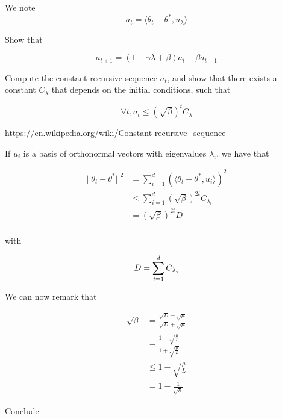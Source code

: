 \documentclass[
10pt, %
a4paper, %
oneside, %
headinclude,footinclude, %
BCOR5mm, %
]{scrartcl}
\begin{document}
We note
\begin{equation}
    a_t = \langle \theta_{t}- \theta^*, u_{\lambda} \rangle
\end{equation}

\exercice{} Show that 

\begin{equation}
    a_{t+1} = (1- \gamma \lambda +\beta) a_t- \beta a_{t-1}
\end{equation}

\exercice{\textbf{}} Compute the constant-recursive sequence $a_t$, and show
that there exists  a constant $C_{\lambda}$ that depends on the initial
conditions, such that

\begin{equation}
    \forall t, a_t\leq ( \sqrt{\beta} )^t C_{\lambda}
\end{equation}

\url{https://en.wikipedia.org/wiki/Constant-recursive_sequence} 

If $u_i$ is a basis of orthonormal vectors with eigenvalues $\lambda_i$, we have that

\begin{equation}
    \begin{aligned}
        \label{eq:}
	|| \theta_{t}-\theta^*||^2 &= \sum^{d}_{i=1}(\langle\theta_{t}-\theta^*, u_i \rangle)^2 \\
	&\leq \sum^{d}_{i=1} (\sqrt{\beta})^{2t} C_{\lambda_i}\\
	&= (\sqrt{\beta})^{2t} D\\
    \end{aligned}
\end{equation}

with 

\begin{equation}
    D = \sum^{d}_{i=1}  C_{\lambda_i}\\
\end{equation}

We can now remark that

\begin{equation}
    \begin{aligned}
        \label{eq:}
	\sqrt{\beta} &= \frac{ \sqrt{L} - \sqrt{\mu} }{ \sqrt{L} + \sqrt{\mu} } \\
	&=  \frac{1- \sqrt{ \frac{\mu}{L}}}{1+ \sqrt{ \frac{\mu}{L}}} \\
	&\leq 1- \sqrt{\frac{\mu}{L}}\\
	&= 1- \frac{1}{ \sqrt{\kappa} } 
    \end{aligned}
\end{equation}

\exercice{} Conclude
\end{document}
